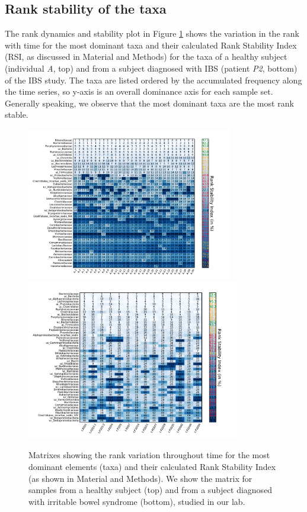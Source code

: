 \subsection*{Rank stability of the taxa} 
The rank dynamics and stability plot in Figure \ref{fig:corrank} shows the variation in the rank with time for the most dominant taxa and their calculated Rank Stability Index (RSI, as discussed in Material and Methods) for the taxa of a healthy subject (individual \emph{A}, top) and from a subject diagnosed with IBS (patient \emph{P2}, bottom) of the IBS study\cite{IBS}. The taxa are listed ordered by the accumulated frequency along the time series, so y-axis is an overall dominance axis for each sample set. Generally speaking, we observe that the most dominant taxa are the most rank stable. 

\begin{figure}
	\centering
	\vspace*{-10mm} %
	\includegraphics[width=0.8\textwidth]{results/corrank/IBS_h_A_amplicons_family_Rank.pdf}\vspace*{-3mm} %
	\hspace*{-4.5mm}\includegraphics[width=0.83\textwidth]{results/corrank/IBS_P2_Metatranscriptores_Rank.pdf}
	\caption{Matrixes showing the rank variation throughout time for the most dominant elements (taxa) and their calculated Rank Stability Index (as shown in Material and Methods). We show the matrix for samples from a healthy subject (top) and from a subject diagnosed with irritable bowel syndrome (bottom), studied in our lab\cite{IBS}.}
	\label{fig:corrank}
\end{figure}

